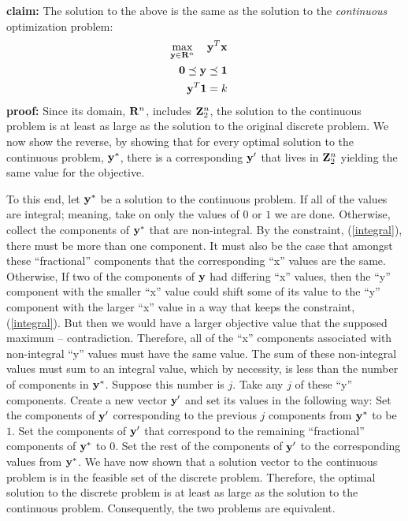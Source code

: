 \documentclass[12pt]{article}
\begin{document}
{\bf claim:} The solution to the above is the same as the solution to the 
{\it continuous\/} optimization problem: 
\begin{eqnarray}
\mathop{\rm max}_{{\bf y} \in {\bf R}^n}\limits \quad {\bf y}^T {\bf x} &&  \\
{\bf 0} \preceq {\bf y}   \preceq  {\bf 1}&& \\ 
{\bf y}^T {\bf 1}  =  k && \label{integral} 
\end{eqnarray}
{\bf proof:}
Since its domain, ${\bf R}^n$, 
includes ${\bf Z}_2^n$, the solution to the continuous problem is at least as 
large as the solution to the original discrete problem.
We now show the reverse, by showing that for every optimal solution to the 
continuous problem, ${\bf y}^*$, there is a corresponding ${\bf y}^\prime$ that 
lives in ${\bf Z}_2^n$ yielding the same value for the objective.

To this end, let ${\bf y}^*$ be a solution to the continuous problem. If all
of the values are integral; meaning, take on only the values of $0$ or $1$ we 
are done. Otherwise, collect the components of ${\bf y}^*$ that are non-integral.
By the constraint, (\ref{integral}), there must be more than one component. 
It must also be the case that amongst these ``fractional'' components that
the corresponding ``x'' values are the same. Otherwise, If two of the components 
of ${\bf y}$ had differing ``x'' values, then the ``y'' component with the 
smaller ``x'' value could shift some of its value to the ``y'' component with 
the larger ``x'' value in a way that keeps the constraint, (\ref{integral}). 
But then we would have a larger objective value that the supposed maximum 
-- contradiction. Therefore, all of the 
``x'' components associated with non-integral ``y'' values must have the same 
value. The sum of these non-integral values must sum to an integral value, which 
by necessity, is less than the number of components in ${\bf y}^*$. Suppose 
this number is $j$. Take any $j$ of these ``y'' components. Create a new 
vector ${\bf y}^\prime$ and set its values in the following way: Set the 
components of ${\bf y}^\prime$ corresponding to the previous $j$ components 
from ${\bf y}^*$ to be $1$. Set the components of ${\bf y}^\prime$ that 
correspond to the remaining ``fractional'' components of ${\bf y}^*$ to $0$. 
Set the rest of the components of ${\bf y}^\prime$ to the 
corresponding values from ${\bf y}^*$. We have now shown that a solution vector 
to the continuous problem is in the feasible set of the discrete problem. 
Therefore, the optimal solution to the discrete problem is at least as large as 
the solution to the continuous problem. Consequently, the two problems are 
equivalent.
\end{document}
